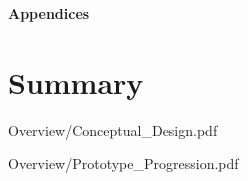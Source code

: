 \documentclass[a4 paper, 12pt]{article}
\begin{document}
\pagebreak
\begin{center}
    \Huge \textbf{Appendices}
    \section{Summary}
\end{center}


    \pagebreak     
    
                    {Overview/Conceptual_Design.pdf}
                    \label{sec:D.1}

    \pagebreak   
    \label{sec:D.2}  
    
                    {Overview/Prototype_Progression.pdf}
                    
\end{document}
